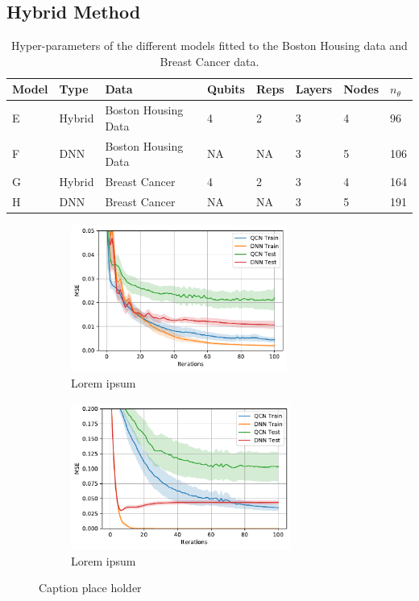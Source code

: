 \subsection{Hybrid Method}\label{sec:Hybrid Method}



\begin{table}[H]
\centering
\begin{tabular}{|l|l|l|l|l|l|l|l|}
\hline
Model& Type& Data& Qubits& Reps& Layers & Nodes &$n_{\theta}$ \\ \hline
E    & Hybrid & Boston Housing Data  & 4     & 2&3      & 4& 96   \\ \hline
F    & DNN & Boston Housing Data  & NA    & NA&3      & 5& 106 \\ \Xhline{2\arrayrulewidth}
G    & Hybrid & Breast Cancer        & 4     & 2&3      & 4& 164  \\ \hline
H    & DNN & Breast Cancer        & NA    & NA&3      & 5& 191  \\ \hline
\end{tabular}
\caption{Hyper-parameters of the different models fitted to the Boston Housing data and Breast Cancer data.} 
\label{tab:training models Hybrid}
\end{table}

\begin{figure}[H]
    \centering
    \begin{subfigure}[t]{0.5\textwidth}
        \centering
        \includegraphics[height=1.9in]{latex/figures/Boston_Hybrid.pdf}
        \caption{Lorem ipsum}
        
    \end{subfigure}%
    \hfill 
    \begin{subfigure}[t]{0.5\textwidth}
        \centering
        \includegraphics[height=1.9in]{latex/figures/Cancer_Hybrid.pdf}
        \caption{Lorem ipsum}
    \end{subfigure}
    \caption{Caption place holder}
    \label{fig:}
\end{figure}

